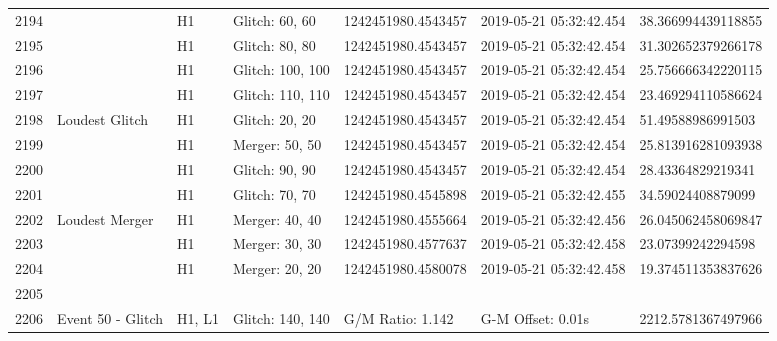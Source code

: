 \begin{longtable}{lllllll}
2194 &                                                    &       H1 &    Glitch: 60, 60 &  1242451980.4543457 &  2019-05-21 05:32:42.454 &  38.366994439118855 \\
2195 &                                                    &       H1 &    Glitch: 80, 80 &  1242451980.4543457 &  2019-05-21 05:32:42.454 &  31.302652379266178 \\
2196 &                                                    &       H1 &  Glitch: 100, 100 &  1242451980.4543457 &  2019-05-21 05:32:42.454 &  25.756666342220115 \\
2197 &                                                    &       H1 &  Glitch: 110, 110 &  1242451980.4543457 &  2019-05-21 05:32:42.454 &  23.469294110586624 \\
2198 &                                     Loudest Glitch &       H1 &    Glitch: 20, 20 &  1242451980.4543457 &  2019-05-21 05:32:42.454 &   51.49588986991503 \\
2199 &                                                    &       H1 &    Merger: 50, 50 &  1242451980.4543457 &  2019-05-21 05:32:42.454 &  25.813916281093938 \\
2200 &                                                    &       H1 &    Glitch: 90, 90 &  1242451980.4543457 &  2019-05-21 05:32:42.454 &   28.43364829219341 \\
2201 &                                                    &       H1 &    Glitch: 70, 70 &  1242451980.4545898 &  2019-05-21 05:32:42.455 &   34.59024408879099 \\
2202 &                                     Loudest Merger &       H1 &    Merger: 40, 40 &  1242451980.4555664 &  2019-05-21 05:32:42.456 &  26.045062458069847 \\
2203 &                                                    &       H1 &    Merger: 30, 30 &  1242451980.4577637 &  2019-05-21 05:32:42.458 &   23.07399242294598 \\
2204 &                                                    &       H1 &    Merger: 20, 20 &  1242451980.4580078 &  2019-05-21 05:32:42.458 &  19.374511353837626 \\
2205 &                                                    &          &                   &                     &                          &                     \\
2206 &                                  Event 50 - Glitch &   H1, L1 &  Glitch: 140, 140 &    G/M Ratio: 1.142 &        G-M Offset: 0.01s &  2212.5781367497966 \\

\end{longtable}
